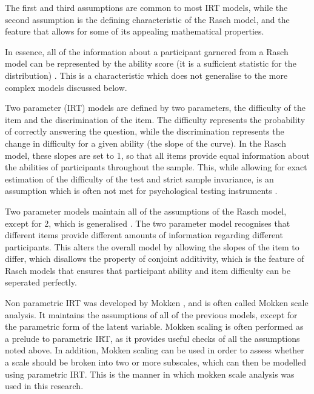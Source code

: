 The first and third assumptions are common to most IRT models, while the second assumption is the defining characteristic of the Rasch model, and the feature that allows for some of its appealing mathematical properties.

In essence, all of the information about a participant garnered from a Rasch model can be represented by the ability score (it is a sufficient statistic for the distribution) \cite{fischer1995rasch}. This is a characteristic which does not generalise to the more complex models discussed below.

Two parameter (IRT) models are defined by two parameters, the difficulty of the item and the discrimination of the item. The difficulty represents the probability of correctly answering the question, while the discrimination represents the change in difficulty for a given ability (the slope of the curve). In the Rasch model, these slopes are set to 1, so that all items provide equal information about the abilities of participants throughout the sample. This, while allowing for exact estimation of the difficulty of the test and strict sample invariance, is an assumption which is often not met for psychological testing instruments \cite{embretson2000item}.

Two parameter models maintain all of the assumptions of the Rasch model, except for 2, which is generalised \cite{van1997handbook}. The two parameter model recognises that different items provide different amounts of information regarding different participants. This alters the overall model by allowing the slopes of the item to differ, which disallows the property of conjoint additivity, which is the feature of Rasch models that ensures that participant ability and item difficulty can be seperated perfectly.

Non parametric IRT was developed by Mokken \cite{mokken1997nonparametric}, and is often called Mokken scale analysis\cite{van2007mokken}. It maintains the assumptions of all of the previous models, except for the parametric form of the latent variable. Mokken scaling is often performed as a prelude to parametric IRT, as it provides useful checks of all the assumptions noted above. In addition, Mokken scaling can be used in order to assess whether a scale should be broken into two or more subscales, which can then be modelled using parametric IRT. This is the manner in which mokken scale analysis was used in this research. 


